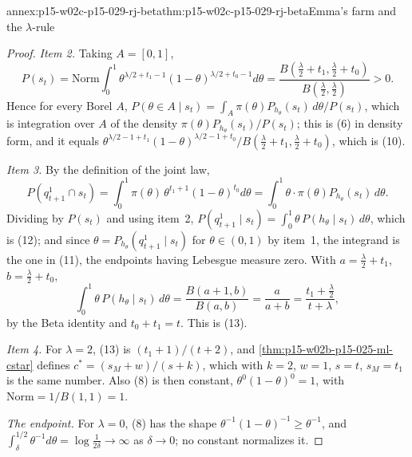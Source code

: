 \begin{annexitem}{annex:p15-w02c-p15-029-rj-beta}{thm:p15-w02c-p15-029-rj-beta}{Emma's farm and the \texorpdfstring{\(\lambda\)}{lambda}-rule}
\begin{proof}
\emph{Item 2.} Taking \(A=[0,1]\),
\[
 P(s_t)=\mathrm{Norm}\int_0^1\theta^{\lambda/2+t_1-1}(1-\theta)^{\lambda/2+t_0-1}d\theta
 =\frac{B(\tfrac\lambda2+t_1,\tfrac\lambda2+t_0)}{B(\tfrac\lambda2,\tfrac\lambda2)}>0 .
\]
Hence for every Borel \(A\),
\(P(\theta\in A\mid s_t)=\int_A\pi(\theta)P_{h_\theta}(s_t)\,d\theta/P(s_t)\),
which is integration over \(A\) of the density
\(\pi(\theta)P_{h_\theta}(s_t)/P(s_t)\); this is (6) in density form, and
it equals
\(\theta^{\lambda/2-1+t_1}(1-\theta)^{\lambda/2-1+t_0}/B(\tfrac\lambda2+t_1,\tfrac\lambda2+t_0)\),
which is (10).

\emph{Item 3.} By the definition of the joint law,
\[
 P(q^1_{t+1}\cap s_t)=\int_0^1\pi(\theta)\,\theta^{t_1+1}(1-\theta)^{t_0}d\theta
 =\int_0^1\theta\cdot\pi(\theta)P_{h_\theta}(s_t)\,d\theta .
\]
Dividing by \(P(s_t)\) and using item~2,
\(P(q^1_{t+1}\mid s_t)=\int_0^1\theta\,P(h_\theta\mid s_t)\,d\theta\),
which is (12); and since \(\theta=P_{h_\theta}(q^1_{t+1}\mid s_t)\) for
\(\theta\in(0,1)\) by item~1, the integrand is the one in (11), the
endpoints having Lebesgue measure zero. With
\(a=\tfrac\lambda2+t_1\), \(b=\tfrac\lambda2+t_0\),
\[
 \int_0^1\theta\,P(h_\theta\mid s_t)\,d\theta=\frac{B(a+1,b)}{B(a,b)}=\frac{a}{a+b}
 =\frac{t_1+\frac\lambda2}{t+\lambda},
\]
by the Beta identity and \(t_0+t_1=t\). This is (13).

\emph{Item 4.} For \(\lambda=2\), (13) is \((t_1+1)/(t+2)\), and
\cref{thm:p15-w02b-p15-025-ml-cstar} defines \(c^*=(s_M+w)/(s+k)\),
which with \(k=2\), \(w=1\), \(s=t\), \(s_M=t_1\) is the same number. Also
(8) is then constant, \(\theta^0(1-\theta)^0=1\), with
\(\mathrm{Norm}=1/B(1,1)=1\).

\emph{The endpoint.} For \(\lambda=0\), (8) has the shape
\(\theta^{-1}(1-\theta)^{-1}\ge\theta^{-1}\), and
\(\int_\delta^{1/2}\theta^{-1}d\theta=\log\frac1{2\delta}\to\infty\) as
\(\delta\to0\); no constant normalizes it.
\end{proof}
\end{annexitem}

